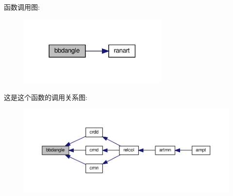 函数调用图\+:
\nopagebreak
\begin{figure}[H]
\begin{center}
\leavevmode
\includegraphics[width=213pt]{bbdangle_8f90_af456b98455d7bcf275c9504421dbb944_cgraph}
\end{center}
\end{figure}
这是这个函数的调用关系图\+:
\nopagebreak
\begin{figure}[H]
\begin{center}
\leavevmode
\includegraphics[width=350pt]{bbdangle_8f90_af456b98455d7bcf275c9504421dbb944_icgraph}
\end{center}
\end{figure}
